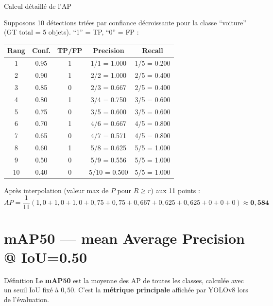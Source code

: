 \documentclass[12pt, a4paper]{report}
\begin{document}
\begin{examplebox}{Calcul détaillé de l'AP}

  Supposons 10 détections triées par confiance décroissante pour la classe
  ``voiture'' (GT total = 5 objets). ``1'' = TP, ``0'' = FP :

  \vspace{0.3cm}
  \begin{center}
  \begin{tabular}{ccccc}
    \toprule
    \textbf{Rang} & \textbf{Conf.} & \textbf{TP/FP} & \textbf{Precision} & \textbf{Recall} \\
    \midrule
    1 & 0.95 & 1 & 1/1 = 1.000 & 1/5 = 0.200 \\
    2 & 0.90 & 1 & 2/2 = 1.000 & 2/5 = 0.400 \\
    3 & 0.85 & 0 & 2/3 = 0.667 & 2/5 = 0.400 \\
    4 & 0.80 & 1 & 3/4 = 0.750 & 3/5 = 0.600 \\
    5 & 0.75 & 0 & 3/5 = 0.600 & 3/5 = 0.600 \\
    6 & 0.70 & 1 & 4/6 = 0.667 & 4/5 = 0.800 \\
    7 & 0.65 & 0 & 4/7 = 0.571 & 4/5 = 0.800 \\
    8 & 0.60 & 1 & 5/8 = 0.625 & 5/5 = 1.000 \\
    9 & 0.50 & 0 & 5/9 = 0.556 & 5/5 = 1.000 \\
    10 & 0.40 & 0 & 5/10 = 0.500 & 5/5 = 1.000 \\
    \bottomrule
  \end{tabular}
  \end{center}

  Après interpolation (valeur max de $P$ pour $R \geq r$) aux 11 points :
  \[
    AP = \frac{1}{11}(1{,}0 + 1{,}0 + 1{,}0 + 0{,}75 + 0{,}75 + 0{,}667 +
         0{,}625 + 0{,}625 + 0 + 0 + 0)
       \approx \mathbf{0{,}584}
  \]
\end{examplebox}

\section{mAP50 — mean Average Precision @ IoU=0.50}

\begin{definitionbox}{Définition}
  Le \textbf{mAP50} est la moyenne des AP de toutes les classes, calculée avec
  un seuil IoU fixé à $0{,}50$. C'est la \textbf{métrique principale} affichée
  par YOLOv8 lors de l'évaluation.
\end{definitionbox}
\end{document}
